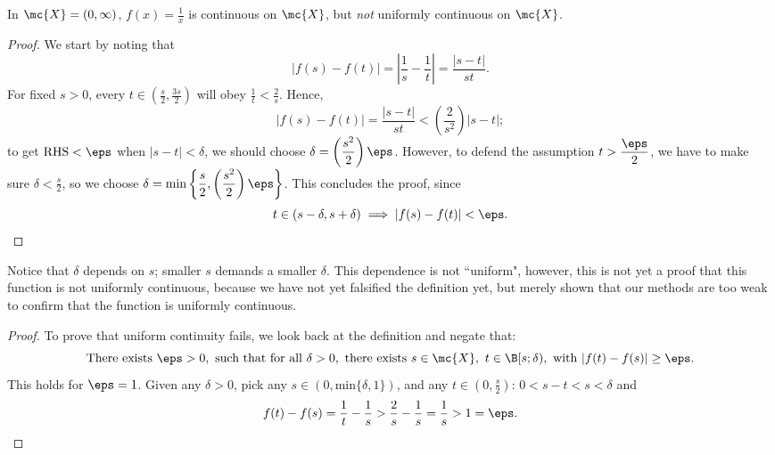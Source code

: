 \begin{example}
	In \(\mc{X}=(0,\infty)\), \(f(x)=\displaystyle\frac{1}{x}\) is continuous on \(\mc{X}\), but \emph{not} uniformly continuous on \(\mc{X}\).
	\begin{proof}
		We start by noting that
		\begin{equation*}
			\left|f(s)-f(t)\right|=\left|\frac{1}{s}-\frac{1}{t}\right|=\frac{|s-t|}{st}.
		\end{equation*}
		For fixed \(s>0\), every \(t\in\left(\displaystyle\frac{s}{2},\frac{3s}{2}\right)\) will obey \(\displaystyle\frac{1}{t}<\frac{2}{s}\). Hence, 
		\begin{equation*}
			|f(s)-f(t)|=\frac{|s-t|}{st}<\left(\frac{2}{s^2}\right)|s-t|;
		\end{equation*}
		to get \(\text{RHS}<\eps\) when \(|s-t|<\delta\), we should choose \(\delta=\displaystyle\left(\frac{s^2}{2}\right)\eps\). However, to defend the assumption \(t>\displaystyle\frac{\eps}{2}\), we have to make sure \(\delta<\displaystyle\frac{s}{2}\), so we choose \(\delta=\text{min}\left\{\displaystyle\frac{s}{2},\left(\displaystyle\frac{s^2}{2}\right)\eps\right\}\). This concludes the proof, since 
		\begin{equation*}
			t\in(s-\delta,s+\delta)\implies |f(s)-f(t)|<\eps.
		\end{equation*}
	\end{proof}
	\begin{note}
		Notice that \(\delta\) depends on \(s\); smaller \(s\) demands a smaller \(\delta\). This dependence  is not ``uniform", however, this is not yet a proof that this function is not uniformly continuous, because we have not yet falsified the definition yet, but merely shown that our methods are too weak to confirm that the function is uniformly continuous.
	\end{note}
	\begin{proof}
		To prove that uniform continuity fails, we look back at the definition and negate that:
		\begin{equation*}
			\text{There exists}~\eps>0,~\text{such that for all}~\delta>0,~\text{there exists}~s\in\mc{X},~t\in\B[s;\delta),~\text{with}~|f(t)-f(s)|\geq\eps.
		\end{equation*}
		This holds for \(\eps=1\). Given any \(\delta>0\), pick any \(s\in\left(0,\text{min}\{\delta,1\}\right)\), and any \(t\in\left(0,\displaystyle\frac{s}{2}\right)\): \(0<s-t<s<\delta\) and
		\begin{equation*}
			f(t)-f(s)=\frac{1}{t}-\frac{1}{s}>\frac{2}{s}-\frac{1}{s}=\frac{1}{s}>1=\eps.
		\end{equation*}
	\end{proof}
\end{example}
